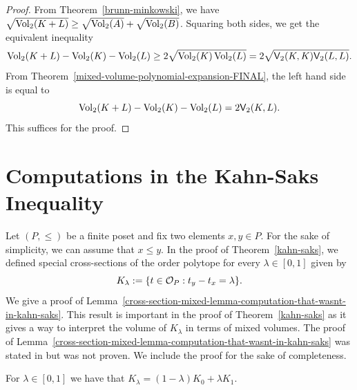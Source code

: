 \documentclass{puthesis-UG}
\begin{document}
\begin{proof}
	From Theorem~\ref{brunn-minkowski}, we have $\sqrt{\operatorname{Vol}_2(K + L)} \geq \sqrt{\operatorname{Vol}_2(A)} + \sqrt{\operatorname{Vol}_2(B)}$. Squaring both sides, we get the equivalent inequality
	\[	
		\operatorname{Vol}_2(K+L) - \operatorname{Vol}_2(K) - \operatorname{Vol}_2(L) \geq 2 \sqrt{\operatorname{Vol}_2(K) \operatorname{Vol}_2(L)} = 2 \sqrt{\mathsf{V}_2(K, K) \mathsf{V}_2(L, L)}.
	\]
	From Theorem~\ref{mixed-volume-polynomial-expansion-FINAL}, the left hand side is equal to 
	\[		
		\operatorname{Vol}_2(K+L) - \operatorname{Vol}_2(K) - \operatorname{Vol}_2(L) = 2 \mathsf{V}_2(K, L).
	\]
	This suffices for the proof. 
\end{proof}

\section{Computations in the Kahn-Saks Inequality}

Let $(P, \leq)$ be a finite poset and fix two elements $x, y \in P$. For the sake of simplicity, we can assume that $x \leq y$. In the proof of Theorem~\ref{kahn-saks}, we defined special cross-sections of the order polytope for every $\lambda \in [0, 1]$ given by
\[
	K_\lambda := \{t \in \mathcal{O}_P : t_y - t_x = \lambda\}.
\]
We give a proof of Lemma~\ref{cross-section-mixed-lemma-computation-that-wasnt-in-kahn-saks}. This result is important in the proof of Theorem~\ref{kahn-saks} as it gives a way to interpret the volume of $K_\lambda$ in terms of mixed volumes. The proof of Lemma~\ref{cross-section-mixed-lemma-computation-that-wasnt-in-kahn-saks} was stated in \cite{balancing-poset-extensions} but was not proven. We include the proof for the sake of completeness. 

\begin{lem} \label{cross-section-mixed-lemma-computation-that-wasnt-in-kahn-saks}
	For $\lambda \in [0, 1]$ we have that $K_\lambda = (1-\lambda) K_0 + \lambda K_1$. 
\end{lem}
\end{document}
